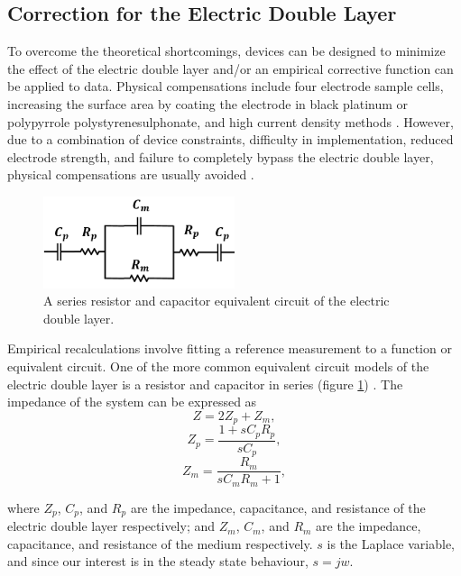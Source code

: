 \subsection{Correction for the Electric Double Layer}

\par To overcome the theoretical shortcomings, devices can be designed to minimize the effect of the electric double layer and/or an empirical corrective function can be applied to data. Physical compensations include four electrode sample cells, increasing the surface area by coating the electrode in black platinum or polypyrrole polystyrenesulphonate, and high current density methods \cite{ishai_electrode_2013}. However, due to a combination of device constraints, difficulty in implementation, reduced electrode strength, and failure to completely bypass the electric double layer, physical compensations are usually avoided \cite{ishai_assessment_2012}. 

\begin{figure}
    \centering
    \includegraphics[width=0.5\textwidth]{images/edl_cap_equiv.png}
    \caption{A series resistor and capacitor equivalent circuit of the electric double layer.}
    \label{fig:edl_cap_equiv}
\end{figure}

\par Empirical recalculations involve fitting a reference measurement to a function or equivalent circuit. One of the more common equivalent circuit models of the electric double layer is a resistor and capacitor in series (figure \ref{fig:edl_cap_equiv}) \cite{feldman_fractal-polarization_1998}. The impedance of the system can be expressed as
\begin{equation}
    Z = 2Z_p + Z_m,
\end{equation}
\begin{equation}
    Z_p = \frac{1 + sC_pR_p}{sC_p},
\end{equation}
\begin{equation}
    Z_m = \frac{R_m}{sC_mR_m+1},
\end{equation}

\noindent where $Z_p$, $C_p$, and $R_p$ are the impedance, capacitance, and resistance of the electric double layer respectively; and $Z_m$, $C_m$, and $R_m$ are the impedance, capacitance, and resistance of the medium respectively. $s$ is the Laplace variable, and since our interest is in the steady state behaviour, $s = jw$.

